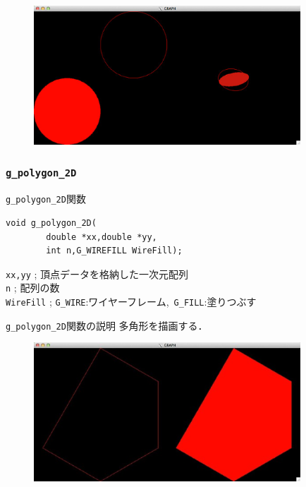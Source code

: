 \documentclass[a4paper,12pt]{jsarticle}%
\begin{document}
\begin{figure}[htb]
	\includegraphics[width=100mm]{./Figures/eps/Canvas_g_circle2.eps}
\end{figure}




\clearpage
\subsubsection{\texttt{g\_polygon\_2D}}

\begin{itembox}[l]{\texttt{g\_polygon\_2D}関数}
\begin{verbatim}
void g_polygon_2D(
        double *xx,double *yy,
        int n,G_WIREFILL WireFill);
\end{verbatim}
\verb|xx,yy| ; 頂点データを格納した一次元配列\\
\verb|n| ; 配列の数\\
\verb|WireFill| ; \verb|G_WIRE|:ワイヤーフレーム,\ \verb|G_FILL|:塗りつぶす \\
\end{itembox}

\begin{itembox}[l]{\texttt{g\_polygon\_2D}関数の説明}
多角形を描画する．
\end{itembox}

\begin{figure}[htb]
	\includegraphics[width=100mm]{./Figures/eps/Canvas_g_polygon.eps}
\end{figure}
\end{document}
